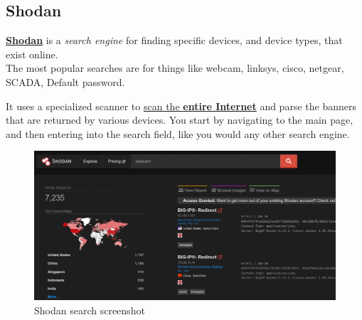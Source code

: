\subsection{Shodan}
\href{https://www.shodan.io/}{\textbf{Shodan}} is a \textit{search engine} for finding specific devices, and
device types, that exist online.\\
The most popular searches are for things like webcam, linksys, cisco, netgear, SCADA, Default password.

It uses a specialized scanner to \underline{scan the \textbf{entire Internet}} and parse the banners that are returned by various devices.
You start by navigating to the main page, and then entering
into the search field, like you would any other search engine.

\begin{figure}[htbp]
   \centering
   \includegraphics{images/shodan.png}
   \caption{Shodan search screenshot}
   \label{fig:shodan}
\end{figure}


